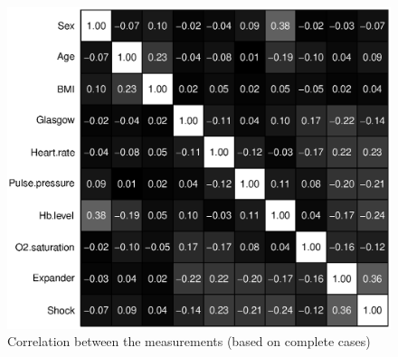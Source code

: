 \begin{figure}[H]
	\centering
   \includegraphics[scale=0.7]{Resources/cor_values}
   \caption{Correlation between the measurements (based on complete cases)}
   \label{fig.cor_values}
\end{figure}